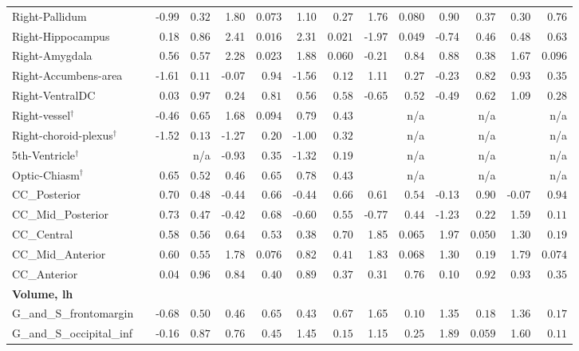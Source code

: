 {\begin{longtable}{llrrrrrrrrrrrr}
Right-Pallidum &  & -0.99 & $0.32$ & 1.80 & $0.073$ & 1.10 & $0.27$ & 1.76 & $0.080$ & 0.90 & $0.37$ & 0.30 & $0.76$ \\
Right-Hippocampus &  & 0.18 & $0.86$ & 2.41 & $0.016$ & 2.31 & $0.021$ & -1.97 & $0.049$ & -0.74 & $0.46$ & 0.48 & $0.63$ \\
Right-Amygdala &  & 0.56 & $0.57$ & 2.28 & $0.023$ & 1.88 & $0.060$ & -0.21 & $0.84$ & 0.88 & $0.38$ & 1.67 & $0.096$ \\
Right-Accumbens-area &  & -1.61 & $0.11$ & -0.07 & $0.94$ & -1.56 & $0.12$ & 1.11 & $0.27$ & -0.23 & $0.82$ & 0.93 & $0.35$ \\
Right-VentralDC &  & 0.03 & $0.97$ & 0.24 & $0.81$ & 0.56 & $0.58$ & -0.65 & $0.52$ & -0.49 & $0.62$ & 1.09 & $0.28$ \\
Right-vessel$^{\dagger}$ &  & -0.46 & $0.65$ & 1.68 & $0.094$ & 0.79 & $0.43$ &  & n/a &  & n/a &  & n/a \\
Right-choroid-plexus$^{\dagger}$ &  & -1.52 & $0.13$ & -1.27 & $0.20$ & -1.00 & $0.32$ &  & n/a &  & n/a &  & n/a \\
5th-Ventricle$^{\dagger}$ &  &  & n/a & -0.93 & $0.35$ & -1.32 & $0.19$ &  & n/a &  & n/a &  & n/a \\
Optic-Chiasm$^{\dagger}$ &  & 0.65 & $0.52$ & 0.46 & $0.65$ & 0.78 & $0.43$ &  & n/a &  & n/a &  & n/a \\
CC\_Posterior &  & 0.70 & $0.48$ & -0.44 & $0.66$ & -0.44 & $0.66$ & 0.61 & $0.54$ & -0.13 & $0.90$ & -0.07 & $0.94$ \\
CC\_Mid\_Posterior &  & 0.73 & $0.47$ & -0.42 & $0.68$ & -0.60 & $0.55$ & -0.77 & $0.44$ & -1.23 & $0.22$ & 1.59 & $0.11$ \\
CC\_Central &  & 0.58 & $0.56$ & 0.64 & $0.53$ & 0.38 & $0.70$ & 1.85 & $0.065$ & 1.97 & $0.050$ & 1.30 & $0.19$ \\
CC\_Mid\_Anterior &  & 0.60 & $0.55$ & 1.78 & $0.076$ & 0.82 & $0.41$ & 1.83 & $0.068$ & 1.30 & $0.19$ & 1.79 & $0.074$ \\
CC\_Anterior &  & 0.04 & $0.96$ & 0.84 & $0.40$ & 0.89 & $0.37$ & 0.31 & $0.76$ & 0.10 & $0.92$ & 0.93 & $0.35$ \\
\midrule\multicolumn{14}{l}{\textbf{Volume, lh}} \\
G\_and\_S\_frontomargin &  & -0.68 & $0.50$ & 0.46 & $0.65$ & 0.43 & $0.67$ & 1.65 & $0.10$ & 1.35 & $0.18$ & 1.36 & $0.17$ \\
G\_and\_S\_occipital\_inf &  & -0.16 & $0.87$ & 0.76 & $0.45$ & 1.45 & $0.15$ & 1.15 & $0.25$ & 1.89 & $0.059$ & 1.60 & $0.11$ \\

\end{longtable}}
